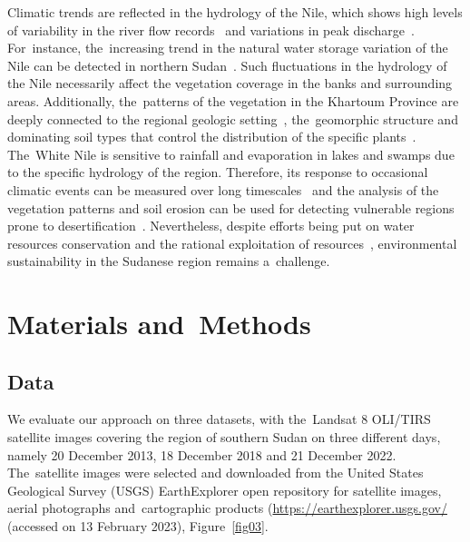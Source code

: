 \documentclass[jimaging,article,accept,pdftex,moreauthors]{Definitions/mdpi}
\begin{document}
Climatic trends are reflected in the hydrology of the Nile, which shows high levels of variability in the river flow records~\cite{CONWAY200599} and variations in peak discharge~\cite{Babiker}. For~instance, the~increasing trend in the natural water storage variation of the Nile can be detected in northern Sudan~\cite{ABDELMALIK2019103596}. Such fluctuations in the hydrology of the Nile necessarily affect the vegetation coverage in the banks and surrounding areas. Additionally, the~patterns of the vegetation in the Khartoum Province are deeply connected to the regional geologic setting~\cite{ELSHEIKH201182}, the~geomorphic structure and dominating soil types that control the distribution of the specific plants~\cite{Mahmoud}. The~White Nile is sensitive to rainfall and evaporation in lakes and swamps due to the specific hydrology of the region. Therefore, its response to occasional climatic events can be measured over long timescales~\cite{Sene} and the analysis of the vegetation patterns and soil erosion can be used for detecting vulnerable regions prone to desertification~\cite{Bakhit}. Nevertheless, despite efforts being put on water resources conservation and the rational exploitation of resources~\cite{MOHAMEDALI2003237,w10111579}, environmental sustainability in the Sudanese region remains a~challenge.
 

\section{Materials and~Methods}\label{sect2}

\subsection{Data}\label{sect2.1}

We evaluate our approach on three datasets, with the~Landsat 8 OLI/TIRS satellite images covering the region of southern Sudan on three different days, %
namely 20 December 2013, 18 December 2018 and 21 December 2022. The~satellite images were selected and downloaded from the United States Geological Survey (USGS) EarthExplorer %
open repository for satellite images, aerial photographs and~cartographic products (\href{https://earthexplorer.usgs.gov/}{https://earthexplorer.usgs.gov/} (accessed on 13 February 2023), %
 Figure~\ref{fig03}.
\end{document}
